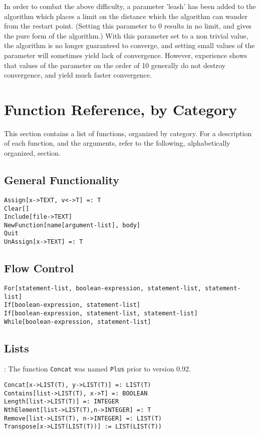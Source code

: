 In order to combat the above difficulty, a parameter 'leash' has been
added to the algorithm which places a limit on the distance which the
algorithm can wander from the restart point. (Setting this parameter
to 0 results in no limit, and gives the pure form of the algorithm.)
With this parameter set to a non trivial value, the algorithm is no
longer guaranteed to converge, and setting small values of the
parameter will sometimes yield lack of convergence.  However,
experience shows that values of the parameter on the order of 10
generally do not destroy convergence, and yield much faster
convergence.

\section{Function Reference, by Category}

This section contains a list of functions, organized by
category.  For a description of each function, and the arguments,
refer to the following, alphabetically organized, section.

\subsection{General Functionality}

\begin{verbatim}
Assign[x->TEXT, v<->T] =: T
Clear[]
Include[file->TEXT]
NewFunction[name[argument-list], body]
Quit
UnAssign[x->TEXT] =: T
\end{verbatim}

\subsection{Flow Control}

\begin{verbatim}
For[statement-list, boolean-expression, statement-list, statement-list]
If[boolean-expression, statement-list]
If[boolean-expression, statement-list, statement-list]
While[boolean-expression, statement-list]
\end{verbatim}

\subsection{Lists}

: The function {\tt Concat} was named {\tt Plus}
prior to version 0.92.

\begin{verbatim}
Concat[x->LIST(T), y->LIST(T)] =: LIST(T)
Contains[list->LIST(T), x->T] =: BOOLEAN
Length[list->LIST(T)] =: INTEGER
NthElement[list->LIST(T),n->INTEGER] =: T 
Remove[list->LIST(T), n->INTEGER] =: LIST(T)
Transpose[x->LIST(LIST(T))] := LIST(LIST(T))
\end{verbatim}

